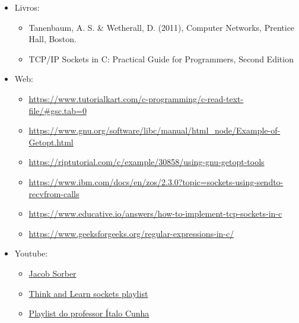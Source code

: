 \documentclass{article}
\begin{document}
\begin{itemize}
      \item Livros:
            \begin{itemize}
                  \item Tanenbaum, A. S. \& Wetherall, D. (2011), Computer
                        Networks, Prentice Hall, Boston.
                  \item TCP/IP Sockets in C\@: Practical Guide for Programmers, Second Edition
            \end{itemize}

      \item Web:
            \begin{itemize}
                  \item

                        \url{https://www.tutorialkart.com/c-programming/c-read-text-file/#gsc.tab=0}
                  \item

                        \url{https://www.gnu.org/software/libc/manual/html_node/Example-of-Getopt.html}
                  \item

                        \url{https://riptutorial.com/c/example/30858/using-gnu-getopt-tools}
                  \item

                        \url{https://www.ibm.com/docs/en/zos/2.3.0?topic=sockets-using-sendto-recvfrom-calls}
                  \item

                        \url{https://www.educative.io/answers/how-to-implement-tcp-sockets-in-c}
                  \item

                        \url{https://www.geeksforgeeks.org/regular-expressions-in-c/}
            \end{itemize}

      \item Youtube:
            \begin{itemize}
                  \item \href{https://www.youtube.com/@JacobSorber}{Jacob
                              Sorber}
                  \item

                        \href{https://www.youtube.com/watch?v=_lQ-3S4fJ0U&list=PLPyaR5G9aNDvs6TtdpLcVO43_jvxp4emI}{Think
                              and Learn sockets playlist}
                  \item

                        \href{https://www.youtube.com/watch?v=tJ3qNtv0HVs&t=2s}{Playlist do professor
                              Ítalo Cunha}
            \end{itemize}

\end{itemize}
\end{document}

